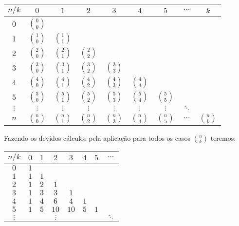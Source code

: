 \documentclass[a4paper,11pt]{book}
\theoremstyle{definition}
\theoremstyle{break}
\begin{document}
\begin{center}
\begin{tabular}{ | c | c c c c c c c c | }
\hline
  $n/k$ &$0$& $1$ & $2$ & $3$ & $4$ & $5$ & $\cdots$ & $k$ \\
\hline
$0$     & \tiny $0 \choose 0$ &               &               &               &               &              &         & \\
$1$     & \tiny $1 \choose 0$ & \tiny $1 \choose 1$ &               &               &               &              &         & \\
$2$     & \tiny $2 \choose 0$ & \tiny $2 \choose 1$ & \tiny $2 \choose 2$ &               &               &              &         & \\
$3$     & \tiny $3 \choose 0$ & \tiny $3 \choose 1$ & \tiny $3 \choose 2$ & \tiny $3 \choose 3$ &               &              &         & \\
$4$     & \tiny $4 \choose 0$ & \tiny $4 \choose 1$ & \tiny $4 \choose 2$ & \tiny $4 \choose 3$ & \tiny $4 \choose 4$ &              &         & \\
$5$     & \tiny $5 \choose 0$ & \tiny $5 \choose 1$ & \tiny $5 \choose 2$ & \tiny $5 \choose 3$ & \tiny $5 \choose 4$ & \tiny $5 \choose 5$&         & \\
$\vdots$&\tiny $\vdots$       &\tiny $\vdots$       &\tiny $\vdots$       &\tiny $\vdots$       &\tiny $\vdots$       &\tiny $\vdots$      &\tiny $\ddots$ & \\
$n$     & \tiny $n \choose 0$ & \tiny $n \choose 1$ & \tiny $n \choose 2$ & \tiny $n \choose 3$ & \tiny $n \choose 4$ & \tiny $n \choose 5$&\tiny $\cdots$ & \tiny $n \choose k$\\
\hline

\end{tabular}
\end{center}
Fazendo os devidos cálculos pela aplicação para todos os casos ${n \choose k}$ teremos:
\begin{center}
\begin{tabular}{ | c | c c c c c c c | }
\hline
 $n/k$ &$0$& $1$ & $2$ & $3$ & $4$ & $5$ & $\cdots$  \\
\hline
$0$     & $1$ &     &        &      &     &     & \\
$1$     & $1$ & $1$ &        &      &     &     & \\
$2$     & $1$ & $2$ & $1$    &      &     &     & \\
$3$     & $1$ & $3$ & $3$    & $1$  &     &     & \\
$4$     & $1$ & $4$ & $6$    & $4$  & $1$ &     & \\
$5$     & $1$ & $5$ & $10$   & $10$ & $5$ & $1$ & \\
$\vdots$&     &     &$\vdots$&      &     &     & $\ddots$ 
\end{tabular}
\end{center}
\end{document}
